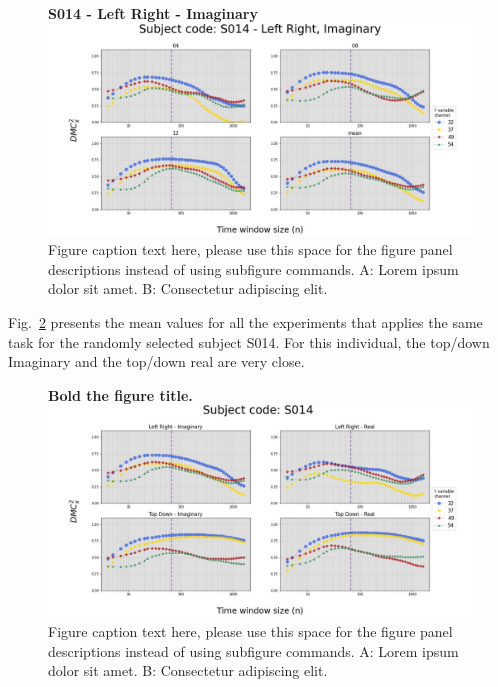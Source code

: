 \documentclass[10pt,letterpaper]{article}
\begin{document}
\begin{figure}[!h]
  \caption{{\bf S014 - Left Right - Imaginary}
  \includegraphics[width=.9\textwidth]{../output/figs/experiments/S014_Left Right_Imaginary.jpg}
  Figure caption text here, please use this space for the figure panel descriptions instead of using subfigure commands. A: Lorem ipsum dolor sit amet. B: Consectetur adipiscing elit.}
  \label{fig:S014_lr_i}
  \end{figure}


Fig.~\ref{fig:4ts14} presents the mean values for all the experiments that applies the same task for the randomly selected subject S014. For this individual, the top/down Imaginary and the top/down real are very close.

\begin{figure}[!h]
\caption{{\bf Bold the figure title.}
\includegraphics[width=.9\textwidth]{../output/figs/stats/S014.jpg}
Figure caption text here, please use this space for the figure panel descriptions instead of using subfigure commands. A: Lorem ipsum dolor sit amet. B: Consectetur adipiscing elit.}
\label{fig:4ts14}
\end{figure}
\end{document}

